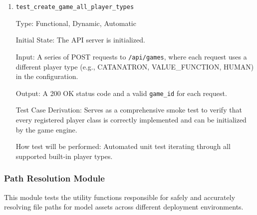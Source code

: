 \documentclass[12pt, titlepage]{article}
\begin{document}
\begin{enumerate}
Type: Functional, Dynamic, Automatic

Initial State: Internal functions are mocked to simulate a custom bot named \"my\_custom\_bot\".

Input: A POST request to \texttt{/api/games} with "BOT:my\_custom\_bot" in the player list.

Output: A successful 200 OK response containing a \texttt{game\_id}.

Test Case Derivation: Confirms that the backend correctly identifies the custom bot prefix, retrieves the mocked configuration, and attempts to instantiate the appropriate player class (like PPOPlayer) with the correct model path.

How test will be performed: Automated unit test with mocked dependencies.

\item
\texttt{test\_create\_game\_all\_player\_types}

Type: Functional, Dynamic, Automatic

Initial State: The API server is initialized.

Input: A series of POST requests to \texttt{/api/games}, where each request uses a different player type (e.g., CATANATRON, VALUE\_FUNCTION, HUMAN) in the configuration.

Output: A 200 OK status code and a valid \texttt{game\_id} for each request.

Test Case Derivation: Serves as a comprehensive smoke test to verify that every registered player class is correctly implemented and can be initialized by the game engine.

How test will be performed: Automated unit test iterating through all supported built-in player types.

\end{enumerate}

\subsubsection{Path Resolution Module}

This module tests the utility functions responsible for safely and accurately resolving file paths for model assets across different deployment environments.
\end{document}
